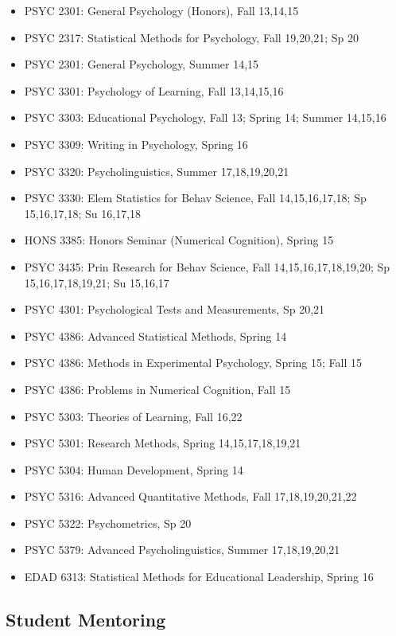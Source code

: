 \documentclass[article,10pt]{article}
\begin{document}
\begin{itemize}
\item PSYC 2301: General Psychology (Honors), Fall 13,14,15
\item PSYC 2317: Statistical Methods for Psychology, Fall 19,20,21; Sp 20
\item PSYC 2301: General Psychology, Summer 14,15
\item PSYC 3301: Psychology of Learning, Fall 13,14,15,16
\item PSYC 3303: Educational Psychology, Fall 13; Spring 14; Summer 14,15,16
\item PSYC 3309: Writing in Psychology, Spring 16
\item PSYC 3320: Psycholinguistics, Summer 17,18,19,20,21
\item PSYC 3330: Elem Statistics for Behav Science, Fall 14,15,16,17,18; Sp 15,16,17,18; Su 16,17,18
\item HONS 3385: Honors Seminar (Numerical Cognition), Spring 15
\item PSYC 3435: Prin Research for Behav Science, Fall 14,15,16,17,18,19,20; Sp 15,16,17,18,19,21; Su 15,16,17
\item PSYC 4301: Psychological Tests and Measurements, Sp 20,21
\item PSYC 4386: Advanced Statistical Methods, Spring 14
\item PSYC 4386: Methods in Experimental Psychology, Spring 15; Fall 15
\item PSYC 4386: Problems in Numerical Cognition, Fall 15
\item PSYC 5303: Theories of Learning, Fall 16,22
\item PSYC 5301: Research Methods, Spring 14,15,17,18,19,21
\item PSYC 5304: Human Development, Spring 14
\item PSYC 5316: Advanced Quantitative Methods, Fall 17,18,19,20,21,22
\item PSYC 5322: Psychometrics, Sp 20
\item PSYC 5379: Advanced Psycholinguistics, Summer 17,18,19,20,21
\item EDAD 6313: Statistical Methods for Educational Leadership, Spring 16
\end{itemize}

\subsection*{Student Mentoring}
\label{sec:orgad30c7d}
\end{document}
